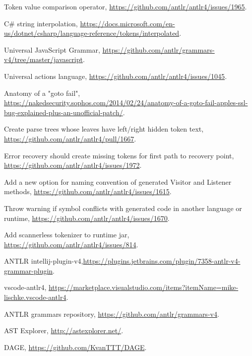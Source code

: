 \documentclass[sigplan,screen]{acmart}
\begin{document}


\begin{thebibliography}{}

 Token value comparison operator, \url{https://github.com/antlr/antlr4/issues/1965}.

 C\# string interpolation, \url{https://docs.microsoft.com/en-us/dotnet/csharp/language-reference/tokens/interpolated}.

 Universal JavaScript Grammar, \url{https://github.com/antlr/grammars-v4/tree/master/javascript}.

 Universal actions language, \url{https://github.com/antlr/antlr4/issues/1045}.

 Anatomy of a "goto fail", \url{https://nakedsecurity.sophos.com/2014/02/24/anatomy-of-a-goto-fail-apples-ssl-bug-explained-plus-an-unofficial-patch/}.

 Create parse trees whose leaves have left/right hidden token text, \url{https://github.com/antlr/antlr4/pull/1667}.

 Error recovery should create missing tokens for first path to recovery point, \url{https://github.com/antlr/antlr4/issues/1972}.

 Add a new option for naming convention of generated Visitor and Listener methods, \url{https://github.com/antlr/antlr4/issues/1615}.

 Throw warning if symbol conflicts with generated code in another language or runtime, \url{https://github.com/antlr/antlr4/issues/1670}.

 Add scannerless tokenizer to runtime jar, \url{https://github.com/antlr/antlr4/issues/814}.

 ANTLR intellij-plugin-v4,\url{https://plugins.jetbrains.com/plugin/7358-antlr-v4-grammar-plugin}.

 vscode-antlr4, \url{https://marketplace.visualstudio.com/items?itemName=mike-lischke.vscode-antlr4}.

 ANTLR grammars repository, \url{https://github.com/antlr/grammars-v4}.

 AST Explorer, \url{http://astexplorer.net/}.

 DAGE, \url{https://github.com/KvanTTT/DAGE}.

\end{thebibliography}
\end{document}
